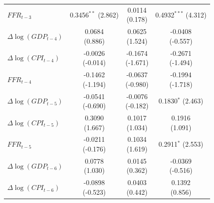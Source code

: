 \documentclass[12pt]{article}
\begin{document}
\begin{enumerate}[label=\alph*.]
\begin{table}[H]
\begin{tabular}{l c c c}
   \(FFR_{t-3}\)              & \shortstack{0.3456$^{**}$\\(2.862)} & \shortstack{0.0114\\(0.178)} & \shortstack{0.4932$^{***}$\\(4.312)} \\
   \(\Delta \log(GDP_{t-4})\) & \shortstack{0.0684\\(0.886)} & \shortstack{0.0625\\(1.524)} & \shortstack{-0.0408\\(-0.557)} \\
   \(\Delta \log(CPI_{t-4})\) & \shortstack{-0.0026\\(-0.014)} & \shortstack{-0.1674\\(-1.671)} & \shortstack{-0.2671\\(-1.494)} \\
   \(FFR_{t-4}\)              & \shortstack{-0.1462\\(-1.194)} & \shortstack{-0.0637\\(-0.980)} & \shortstack{-0.1994\\(-1.718)} \\
   \(\Delta \log(GDP_{t-5})\) & \shortstack{-0.0541\\(-0.690)} & \shortstack{-0.0076\\(-0.182)} & \shortstack{0.1830$^{*}$\\(2.463)} \\
   \(\Delta \log(CPI_{t-5})\) & \shortstack{0.3090\\(1.667)} & \shortstack{0.1017\\(1.034)} & \shortstack{0.1916\\(1.091)} \\
   \(FFR_{t-5}\)              & \shortstack{-0.0211\\(-0.176)} & \shortstack{0.1034\\(1.619)} & \shortstack{0.2911$^{*}$\\(2.553)} \\
   \(\Delta \log(GDP_{t-6})\) & \shortstack{0.0778\\(1.030)} & \shortstack{0.0145\\(0.362)} & \shortstack{-0.0369\\(-0.516)} \\
   \(\Delta \log(CPI_{t-6})\) & \shortstack{-0.0898\\(-0.523)} & \shortstack{0.0403\\(0.442)} & \shortstack{0.1392\\(0.856)} \\

\end{tabular}
\end{table}
\end{enumerate}
\end{document}
